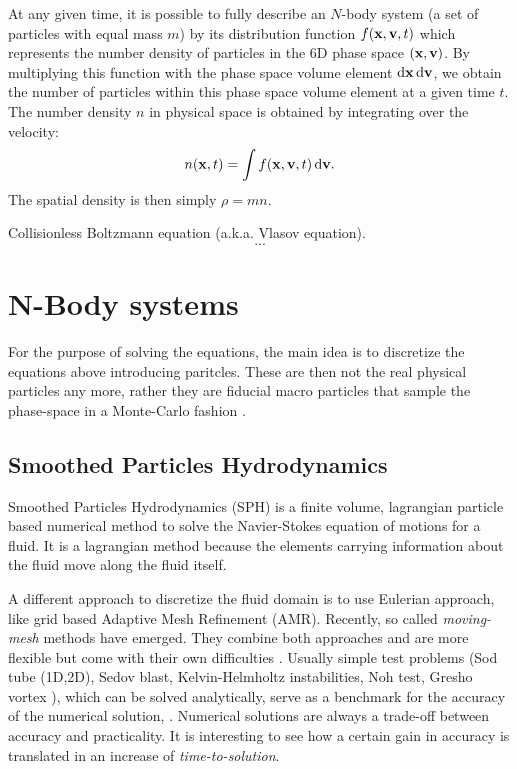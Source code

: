 At any given time, it is possible to fully describe an $N$-body system (a set of particles with equal mass $m$) by its distribution function $f(\boldsymbol{\mathbf{x}}, \boldsymbol{\mathbf{v}}, t)$ which represents the number density of particles in the 6D phase space $(\boldsymbol{\mathbf{x}}, \boldsymbol{\mathbf{v}})$. By multiplying this function with the phase space volume element $\operatorname{d}\!{\boldsymbol{\mathbf{x}}} \operatorname{d}\!{\boldsymbol{\mathbf{v}}}$, we obtain the number of particles within this phase space volume element at a given time $t$.
The number density $n$ in physical space is obtained by integrating over the velocity:
\begin{equation}
n(\boldsymbol{\mathbf{x}},t ) = \int f(\boldsymbol{\mathbf{x}}, \boldsymbol{\mathbf{v}}, t) \operatorname{d}\!{\boldsymbol{\mathbf{v}}}.
\end{equation}
The spatial density is then simply $\rho=mn$.

Collisionless Boltzmann equation (a.k.a. Vlasov equation).
\begin{equation}
...
\end{equation}

\section{N-Body systems}
For the purpose of solving the equations, the main idea is to discretize the equations above introducing paritcles. These are then not the real physical particles any more, rather they are fiducial macro particles that sample the phase-space in a Monte-Carlo fashion \citep{Springel2015}.


\subsection{Smoothed Particles Hydrodynamics}
Smoothed Particles Hydrodynamics (SPH) is a finite volume, lagrangian particle based numerical method to solve the Navier-Stokes equation of motions for a fluid.
It is a lagrangian method because the elements carrying information about the fluid move along the fluid itself.

A different approach to discretize the fluid domain is to use Eulerian approach, like grid based Adaptive Mesh Refinement (AMR).
Recently, so called \emph{moving-mesh} methods have emerged. They combine both approaches and are more flexible but come with their own difficulties \citep{Springel2010, Shadowfax, Arepo}.
Usually simple test problems (Sod tube (1D,2D), Sedov blast, Kelvin-Helmholtz instabilities, Noh test, Gresho vortex \citet{Gresho1990}), %
which can be solved analytically, serve as a benchmark for the accuracy of the numerical solution, \citep[e.g. by measuring the distance of the two solution with an L2-norm in the whole domain, ][]{BorrowSphenix}.
Numerical solutions are always a trade-off between accuracy and practicality.
It is interesting to see how a certain gain in accuracy is translated in an increase of \emph{time-to-solution}.

